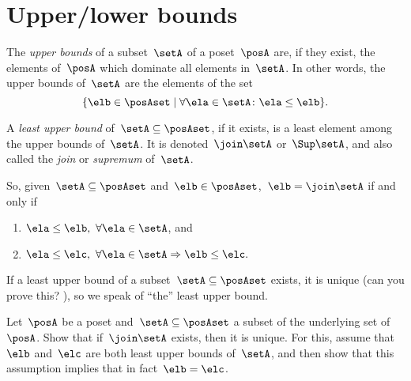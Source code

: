 
\section{Upper/lower bounds}
\begin{ctdefinition}
    \label{def:least-upper-bound}
    The \emph{upper bounds} of a subset~$\setA$ of a poset~$\posA$ are, if they exist, the elements of~$\posA$ which dominate all elements in~$\setA$.
    In other words, the upper bounds of~$\setA$ are the elements of the set
    \begin{equation*}
        \{ \elb \in \posAset \mid \forall \ela \in \setA  \colon \ela \leq \elb \}.
    \end{equation*}
\end{ctdefinition}

\begin{ctdefinition}
    A \emph{least upper bound} of~$\setA \subseteq \posAset$, if it exists, is a least element among the upper bounds of~$\setA$.
    It is denoted~$\join \setA$ or~$\Sup\setA$, and also called the \emph{join} or \emph{supremum} of~$\setA$.
\end{ctdefinition}

So, given~$\setA \subseteq \posAset$ and~$\elb \in \posAset$,~$\elb =  \join \setA$ if and only if
\begin{enumerate}
    \item $\ela \leq \elb, \ \forall \ela \in \setA$, and
    \item $\ela \leq \elc, \ \forall \ela \in \setA \Rightarrow \elb \leq \elc.
          $
\end{enumerate}

If a least upper bound of a subset~$\setA \subseteq \posAset$ exists, it is unique (can you prove this?
), so we speak of ``the'' least upper bound.

\begin{exercise}
    Let~$\posA$ be a poset and~$\setA \subseteq \posAset$ a subset of the underlying set of~$\posA$.
    Show that if~$\join \setA$ exists, then it is unique.
    For this, assume that~$\elb$ and~$\elc$ are both least upper bounds of~$\setA$, and then show that this assumption implies that in fact~$\elb = \elc$.
\end{exercise}
\begin{solution}
    \missingsolution
\end{solution}

